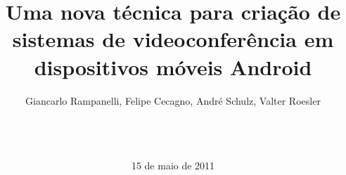 \documentclass{acm_proc_article-sp}
\begin{document}
\title{Uma nova técnica para criação de sistemas de videoconferência em dispositivos móveis Android}
%
%
%
%
%

%
\author{
%
%
Giancarlo Rampanelli, 
Felipe Cecagno,
André Schulz,
Valter Roesler\\
       \\
       \\
       \\
}
\date{15 de maio de 2011}
\end{document}
